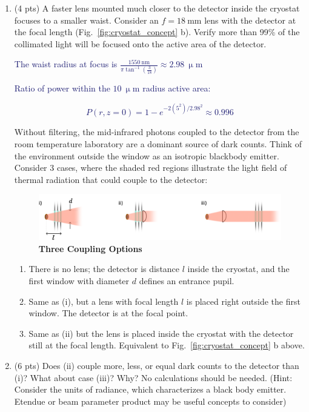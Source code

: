 \documentclass[11pt]{caltech_thesis} %
\begin{document}
\begin{enumerate}
{  }
\item
  (4 pts) A faster lens mounted much closer to the detector inside the
  cryostat focuses to a smaller waist. Consider an
  \(f = 18~\mathrm{mm}\) lens with the detector at the focal length
  (Fig.~\ref{fig:cryostat_concept} b). Verify more than 99\% of the
  collimated light will be focused onto the active area of the detector.

  \textcolor{midnightblue}{ The waist radius at focus is
  \(\frac{1550~\mathrm{nm}}{\pi \tan^{-1}(\frac{3}{18})} \approx 2.98~\mathrm{\upmu m}\)
  }

  \textcolor{midnightblue}{Ratio of power within the
  \(10~\mathrm{\upmu m}\) radius active area: }

  \textcolor{midnightblue}{

  \[P(r, z=0)=1-e^{-2(5^{2}) / 2.98^{2}} \approx \boxed{0.996} \]

  }

  Without filtering, the mid-infrared photons coupled to the detector
  from the room temperature laboratory are a dominant source of dark
  counts. Think of the environment outside the window as an isotropic
  blackbody emitter. Consider 3 cases, where the shaded red regions
  illustrate the light field of thermal radiation that could couple to
  the detector:

  \hypertarget{fig:coupling_options}{%
  \begin{figure}
  \centering
  \includegraphics{chapter_05/figs_05/fig2b_light.pdf}
  \caption[{Cryostat coupling options}]{\textbf{Three Coupling Options}}
  \label{fig:coupling_options}
  \end{figure}
  }

  \begin{enumerate}
  \def\labelenumii{\roman{enumii})}
  \tightlist
  \item
    There is no lens; the detector is distance \(l\) inside the
    cryostat, and the first window with diameter \(d\) defines an
    entrance pupil.
  \item
    Same as (i), but a lens with focal length \(l\) is placed right
    outside the first window. The detector is at the focal point.
  \item
    Same as (ii) but the lens is placed inside the cryostat with the
    detector still at the focal length. Equivalent to
    Fig.~\ref{fig:cryostat_concept} b above.
  \end{enumerate}
\item
  (6 pts) Does (ii) couple more, less, or equal dark counts to the
  detector than (i)? What about case (iii)? Why? No calculations should
  be needed. (Hint: Consider the units of radiance, which characterizes
  a black body emitter. Etendue or beam parameter product may be useful
  concepts to consider)


\end{enumerate}
\end{document}

